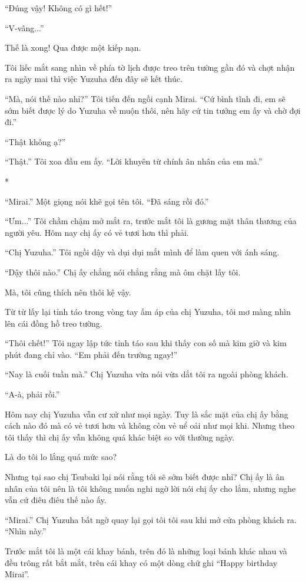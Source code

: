 {``Đúng vậy! Không có gì hết!''

``V-vâng...''

Thế là xong! Qua được một kiếp nạn.

Tôi liếc mắt sang nhìn về phía tờ lịch được treo trên tường gần đó và
chợt nhận ra ngày mai thì việc Yuzuha đến đây sẽ kết thúc.

``Mà, nói thế nào nhỉ?'' Tôi tiến đến ngồi cạnh Mirai. ``Cứ bình tĩnh
đi, em sẽ sớm biết được lý do Yuzuha về muộn thôi, nên hãy cứ tin tưởng
em ấy và chờ đợi đi.''

``Thật không ạ?''

``Thật.'' Tôi xoa đầu em ấy. ``Lời khuyên từ chính ân nhân của em mà.''

*

``Mirai.'' Một giọng nói khẽ gọi tên tôi. ``Đã sáng rồi đó.''

``Ưm...'' Tôi chầm chậm mở mắt ra, trước mắt tôi là gương mặt thân
thương của người yêu. Hôm nay chị ấy có vẻ tươi hơn thì phải.

``Chị Yuzuha.'' Tôi ngồi dậy và dụi dụi mắt mình để làm quen với ánh
sáng.

``Dậy thôi nào.'' Chị ấy chẳng nói chẳng rằng mà ôm chặt lấy tôi.

Mà, tôi cũng thích nên thôi kệ vậy.

Từ từ lấy lại tỉnh táo trong vòng tay ấm áp của chị Yuzuha, tôi mơ màng
nhìn lên cái đồng hồ treo tường.

``Thôi chết!'' Tôi ngay lập tức tỉnh táo sau khi thấy con số mà kim giờ
và kim phút đang chỉ vào. ``Em phải đến trường ngay!''

``Nay là cuối tuần mà.'' Chị Yuzuha vừa nói vừa dắt tôi ra ngoài phòng
khách.

``A-à, phải rồi.''

Hôm nay chị Yuzuha vẫn cư xử như mọi ngày. Tuy là sắc mặt của chị ấy
bằng cách nào đó mà có vẻ tươi hơn và không còn vẻ uể oải như mọi khi.
Nhưng theo tôi thấy thì chị ấy vẫn không quá khác biệt so với thường
ngày.

Là do tôi lo lắng quá mức sao?

Nhưng tại sao chị Tsubaki lại nói rằng tôi sẽ sớm biết được nhỉ? Chị ấy
là ân nhân của tôi nên là tôi không muốn nghi ngờ lời nói chị ấy cho
lắm, nhưng nghe vẫn cứ điêu điêu thế nào ấy.

``Mirai.'' Chị Yuzuha bất ngờ quay lại gọi tôi tôi sau khi mở cửa phòng
khách ra. ``Nhìn này.''

Trước mắt tôi là một cái khay bánh, trên đó là những loại bánh khác nhau
và đều trông rất bắt mắt, trên cái khay có một dòng chữ ghi ``Happy
birthday Mirai''.

}
